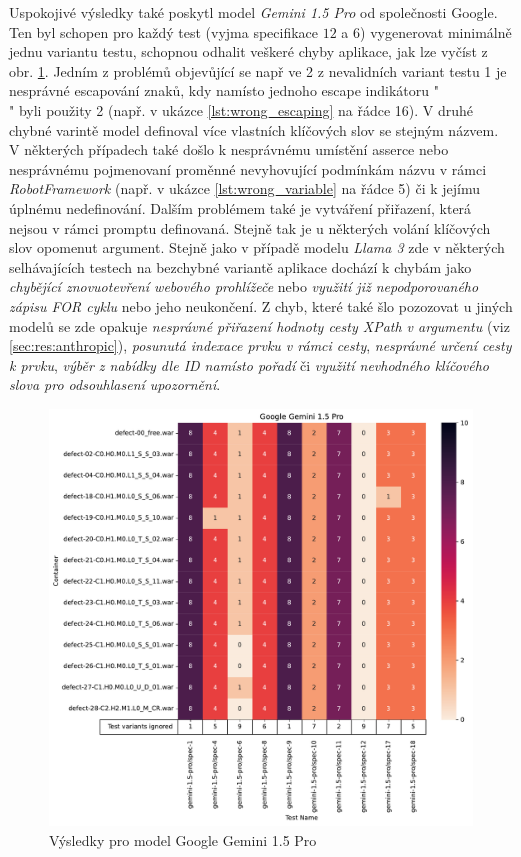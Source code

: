 \documentclass[czech, ma, kiv, he, iso690alph, pdf, viewonly]{fasthesis}
\begin{document}
            Uspokojivé výsledky také poskytl model \textit{Gemini 1.5 Pro} od společnosti Google. Ten byl schopen pro každý test (vyjma specifikace \(12\) a \(6\)) vygenerovat minimálně jednu variantu testu, schopnou odhalit veškeré chyby aplikace, jak lze vyčíst z obr. \ref{fig:res:gemini}. Jedním z problémů objevůjící se např ve 2 z nevalidních variant testu 1 je nesprávné escapování znaků, kdy namísto jednoho escape indikátoru "\\" byli použity 2 (např. v ukázce \ref{lst:wrong_escaping} na řádce 16). V druhé chybné varintě model definoval více vlastních klíčových slov se stejným názvem. V některých případech také došlo k nesprávnému umístění asserce nebo nesprávnému pojmenovaní proměnné nevyhovující podmínkám názvu v rámci \textit{RobotFramework} (např. v ukázce \ref{lst:wrong_variable} na řádce 5) či k jejímu úplnému nedefinování. Dalším problémem také je vytváření přiřazení, která nejsou v rámci promptu definovaná. Stejně tak je u některých volání klíčových slov opomenut argument. Stejně jako v případě modelu \textit{Llama 3} zde v některých selhávajících testech na bezchybné variantě aplikace dochází k chybám jako \textit{chybějící znovuotevření webového prohlížeče} nebo \textit{využití již nepodporovaného zápisu FOR cyklu} nebo jeho neukončení. Z chyb, které také šlo pozozovat u jiných modelů se zde opakuje \textit{nesprávné přiřazení hodnoty cesty XPath v argumentu} (viz \ref{sec:res:anthropic}), \textit{posunutá indexace prvku v rámci cesty}, \textit{nesprávné určení cesty k prvku}, \textit{výběr z nabídky dle ID namísto pořadí} či \textit{využití nevhodného klíčového slova pro odsouhlasení upozornění}.

            \begin{figure}
                \includegraphics[width=\textwidth]{pic/gemini-results.pdf}
                \caption{Výsledky pro model Google Gemini 1.5 Pro}
                \label{fig:res:gemini}
            \end{figure}
\end{document}
